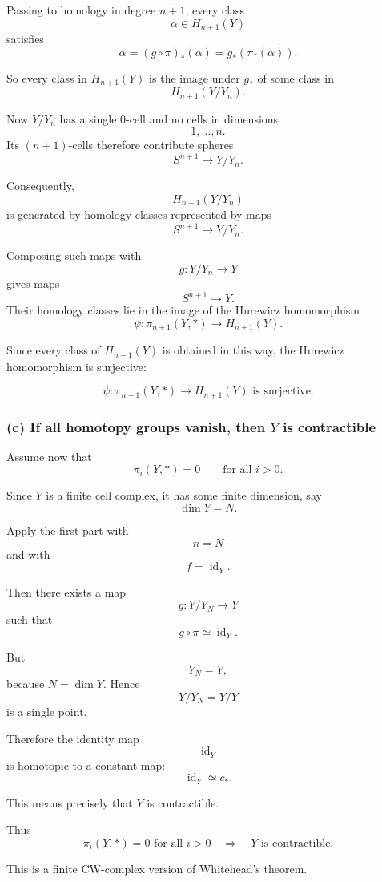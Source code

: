 \documentclass[12pt,a4paper]{article}
\theoremstyle{notespace}
\begin{document}
Passing to homology in degree \(n+1\), every class
\[
\alpha\in H_{n+1}(Y)
\]
satisfies
\[
\alpha
=
(g\circ \pi)_*(\alpha)
=
g_*(\pi_*(\alpha)).
\]

So every class in \(H_{n+1}(Y)\) is the image under \(g_*\) of some class in
\[
H_{n+1}(Y/Y_n).
\]

Now \(Y/Y_n\) has a single \(0\)-cell and no cells in dimensions
\[
1,\ldots,n.
\]
Its \((n+1)\)-cells therefore contribute spheres
\[
S^{n+1}\to Y/Y_n.
\]

Consequently,
\[
H_{n+1}(Y/Y_n)
\]
is generated by homology classes represented by maps
\[
S^{n+1}\to Y/Y_n.
\]

Composing such maps with
\[
g:Y/Y_n\to Y
\]
gives maps
\[
S^{n+1}\to Y.
\]
Their homology classes lie in the image of the Hurewicz homomorphism
\[
\psi:\pi_{n+1}(Y,*)\to H_{n+1}(Y).
\]

Since every class of \(H_{n+1}(Y)\) is obtained in this way, the Hurewicz homomorphism is surjective:

\[
\boxed{
	\psi:\pi_{n+1}(Y,*)\to H_{n+1}(Y)
	\text{ is surjective.}
}
\]

\subsubsection*{(c) If all homotopy groups vanish, then \(Y\) is contractible}

Assume now that
\[
\pi_i(Y,*)=0
\qquad
\text{for all }i>0.
\]

Since \(Y\) is a finite cell complex, it has some finite dimension, say
\[
\dim Y=N.
\]

Apply the first part with
\[
n=N
\]
and with
\[
f=\operatorname{id}_Y.
\]

Then there exists a map
\[
g:Y/Y_N\to Y
\]
such that
\[
g\circ \pi\simeq \operatorname{id}_Y.
\]

But
\[
Y_N=Y,
\]
because \(N=\dim Y\). Hence
\[
Y/Y_N=Y/Y
\]
is a single point.

Therefore the identity map
\[
\operatorname{id}_Y
\]
is homotopic to a constant map:
\[
\operatorname{id}_Y\simeq c_*.
\]

This means precisely that \(Y\) is contractible.

Thus
\[
\boxed{
	\pi_i(Y,*)=0\text{ for all }i>0
	\quad\Longrightarrow\quad
	Y\text{ is contractible.}
}
\]

This is a finite CW-complex version of Whitehead's theorem.

\bigskip
\end{document}
